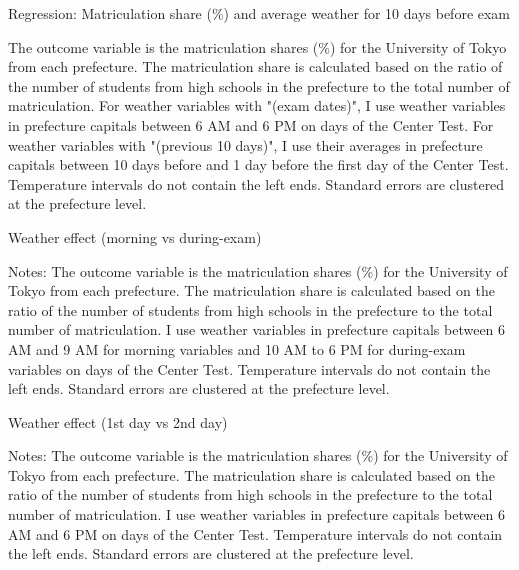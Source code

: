 \documentclass[12pt,letterpaper]{article}
\begin{document}
\begin{table}[H]
  \center
  \caption{Regression: Matriculation share (\%) and average weather for 10 days before exam}
  \scriptsize
  
  \label{tab:reg_pre10}
  \scriptsize
  \begin{tablenotes}
    \item
      The outcome variable is the matriculation shares (\%) for the University of Tokyo from each prefecture.
      The matriculation share is calculated based on the ratio of the number of students from high schools in the prefecture to the total number of matriculation.
      For weather variables with "(exam dates)", I use weather variables in prefecture capitals between 6 AM and 6 PM on days of the Center Test.
      For weather variables with "(previous 10 days)", I use their averages in prefecture capitals between 10 days before and 1 day before the first day of the Center Test.
      Temperature intervals do not contain the left ends.
      Standard errors are clustered at the prefecture level.
  \end{tablenotes}
\end{table}

\begin{table}[!htbp]
  \centering
  \caption{Weather effect (morning vs during-exam)}
  \resizebox{0.6\linewidth}{!}{
  
  }
  \label{tab:morning_exam_reg}
  \footnotesize
  \begin{tablenotes}
    \item 
      Notes:
      The outcome variable is the matriculation shares (\%) for the University of Tokyo from each prefecture.
      The matriculation share is calculated based on the ratio of the number of students from high schools in the prefecture to the total number of matriculation.
      I use weather variables in prefecture capitals between 6 AM and 9 AM for morning variables and 10 AM to 6 PM for during-exam variables on days of the Center Test.
      Temperature intervals do not contain the left ends.
      Standard errors are clustered at the prefecture level.
  \end{tablenotes}
\end{table}

\begin{table}[!htbp]
  \centering
  \caption{Weather effect (1st day vs 2nd day)}
  \resizebox{0.6\linewidth}{!}{
  
  }
  \label{tab:first_second_day_reg}
  \footnotesize
  \begin{tablenotes}
    \item 
      Notes:
      The outcome variable is the matriculation shares (\%) for the University of Tokyo from each prefecture.
      The matriculation share is calculated based on the ratio of the number of students from high schools in the prefecture to the total number of matriculation.
      I use weather variables in prefecture capitals between 6 AM and 6 PM on days of the Center Test.
      Temperature intervals do not contain the left ends.
      Standard errors are clustered at the prefecture level.
  \end{tablenotes}
\end{table}
\end{document}
